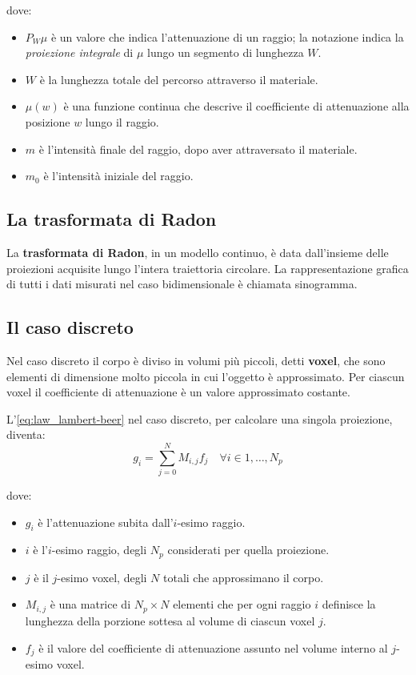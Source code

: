 \documentclass[12pt,a4paper]{report}
\begin{document}
dove:
\begin{itemize}
  \item \(P_W\mu\) è un valore che indica l'attenuazione di un raggio; la notazione indica la \textit{proiezione integrale} di
        \(\mu\) lungo un segmento di lunghezza \(W\).
  \item \(W\) è la lunghezza totale del percorso attraverso il materiale.
  \item \(\mu(w)\) è una funzione continua che descrive il coefficiente di attenuazione alla posizione \(w\) lungo il raggio.
  \item \(m\) è l'intensità finale del raggio, dopo aver attraversato il materiale.
  \item \(m_0\) è l'intensità iniziale del raggio.
\end{itemize}

\subsection{La trasformata di Radon}

La \textbf{trasformata di Radon}, in un modello continuo, è data dall'insieme delle proiezioni acquisite lungo l'intera
traiettoria circolare.
La rappresentazione grafica di tutti i dati misurati nel caso bidimensionale è chiamata sinogramma.

\subsection{Il caso discreto}

Nel caso discreto il corpo è diviso in volumi più piccoli, detti \textbf{voxel}, che sono elementi di dimensione molto piccola in
cui l'oggetto è approssimato.
Per ciascun voxel il coefficiente di attenuazione è un valore approssimato costante.

L'\autoref{eq:law_lambert-beer} nel caso discreto, per calcolare una singola proiezione, diventa:
\begin{equation} \label{eq:law_lambert-beer_discrete}
  g_i = \sum_{j=0}^N M_{i, j} f_j \quad \forall i \in 1, \dots, N_p
\end{equation}

dove:
\begin{itemize}
  \item \(g_i\) è l'attenuazione subita dall'\(i\)-esimo raggio.
  \item \(i\) è l'\(i\)-esimo raggio, degli \(N_p\) considerati per quella proiezione.
  \item \(j\) è il \(j\)-esimo voxel, degli \(N\) totali che approssimano il corpo.
  \item \(M_{i,j}\) è una matrice di \(N_p \times N\) elementi che per ogni raggio \(i\) definisce la lunghezza della porzione
        sottesa al volume di ciascun voxel \(j\).
  \item \(f_j\) è il valore del coefficiente di attenuazione assunto nel volume interno al \(j\)-esimo voxel.
\end{itemize}
\end{document}
